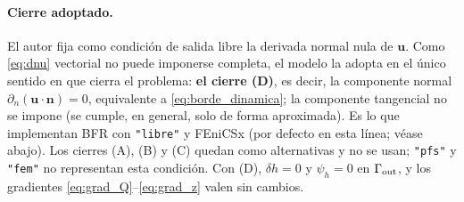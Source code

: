\documentclass[11pt]{article}
\numberwithin{equation}{section}
\theoremstyle{plain}
\theoremstyle{definition}
\theoremstyle{remark}
\newcommand{\bu}{\mathbf{u}}
\newcommand{\bn}{\mathbf{n}}
\begin{document}
\paragraph{Cierre adoptado.} El autor fija como condición de salida libre la derivada normal nula de $\bu$. Como \eqref{eq:dnu} vectorial no puede imponerse completa, el modelo la adopta en el único sentido en que cierra el problema: \textbf{el cierre (D)}, es decir, la componente normal $\partial_n(\bu\cdot\bn)=0$, equivalente a \eqref{eq:borde_dinamica}; la componente tangencial no se impone (se cumple, en general, solo de forma aproximada). Es lo que implementan BFR con \texttt{"libre"} y FEniCSx (por defecto en esta línea; véase abajo). Los cierres (A), (B) y (C) quedan como alternativas y no se usan; \texttt{"pfs"} y \texttt{"fem"} no representan esta condición. Con (D), $\delta h=0$ y $\psi_h=0$ en $\Gamma_{\rm out}$, y los gradientes \eqref{eq:grad_Q}--\eqref{eq:grad_z} valen sin cambios.
\end{document}
